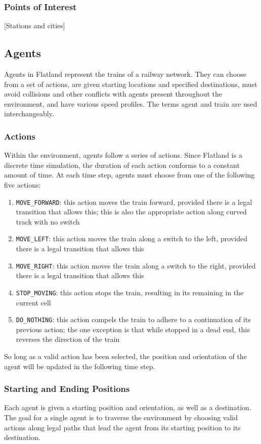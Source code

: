 \documentclass[11pt]{article}
\newcommand{\code}[1]{\colorbox{light-gray}{\texttt{#1}}}
\begin{document}
\subsubsection{Points of Interest}
[Stations and cities]


\subsection{Agents}
Agents in Flatland represent the trains of a railway network.  They can choose from a set of actions, are given starting locations and specified destinations, must avoid collisions and other conflicts with agents present throughout the environment, and have various speed profiles.  The terms agent and train are used interchangeably.

\subsubsection{Actions}
Within the environment, agents follow a series of actions.  Since Flatland is a discrete time simulation, the duration of each action conforms to a constant amount of time.    At each time step, agents must choose from one of the following five actions: 
\begin{enumerate}
  \item \code{MOVE\_FORWARD}: this action moves the train forward, provided there is a legal transition that allows this; this is also the appropriate action along curved track with no switch
  \item \code{MOVE\_LEFT}: this action moves the train along a switch to the left, provided there is a legal transition that allows this
  \item \code{MOVE\_RIGHT}: this action moves the train along a switch to the right, provided there is a legal transition that allows this
  \item \code{STOP\_MOVING}: this action stops the train, resulting in its remaining in the current cell
  \item\code{{DO\_NOTHING}}: this action compels the train to adhere to a continuation of its previous action; the one exception is that while stopped in a dead end, this reverses the direction of the train
\end{enumerate} \smallskip

\noindent So long as a valid action has been selected, the position and orientation of the agent will be updated in the following time step. \medskip

\subsubsection{Starting and Ending Positions}
Each agent is given a starting position and orientation, as well as a destination.  The goal for a single agent is to traverse the environment by choosing valid actions along legal paths that lead the agent from its starting position to its destination.  
\end{document}
